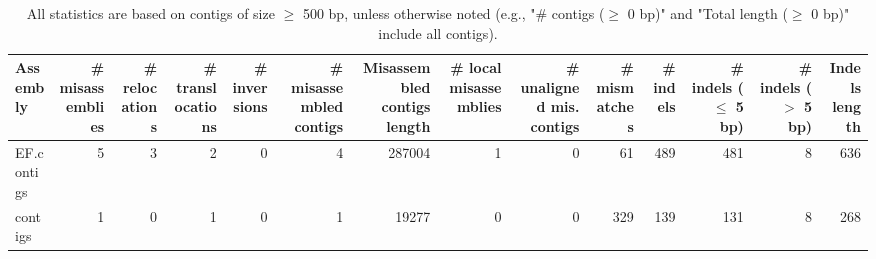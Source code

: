 \documentclass[12pt,a4paper]{article}
\begin{document}
\begin{table}[ht]
\begin{center}
\caption{All statistics are based on contigs of size $\geq$ 500 bp, unless otherwise noted (e.g., "\# contigs ($\geq$ 0 bp)" and "Total length ($\geq$ 0 bp)" include all contigs).}
\begin{tabular}{|l*{13}{|r}|}
\hline
Assembly & \# misassemblies &     \# relocations &     \# translocations &     \# inversions & \# misassembled contigs & Misassembled contigs length & \# local misassemblies & \# unaligned mis. contigs & \# mismatches & \# indels &     \# indels ($\leq$ 5 bp) &     \# indels ($>$ 5 bp) & Indels length \\ \hline
EF.contigs & 5 & 3 & 2 & 0 & 4 & 287004 & 1 & 0 & 61 & 489 & 481 & 8 & 636 \\ \hline
contigs & 1 & 0 & 1 & 0 & 1 & 19277 & 0 & 0 & 329 & 139 & 131 & 8 & 268 \\ \hline
\end{tabular}
\end{center}
\end{table}
\end{document}
